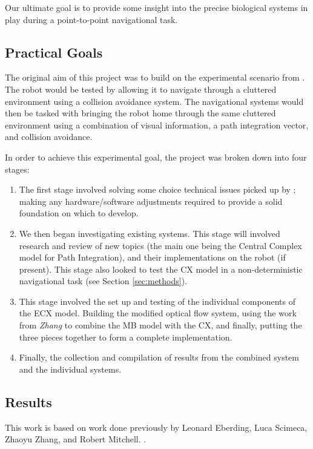 \documentclass[a4paper,11pt,twoside,openright]{article}
\begin{document}
Our ultimate goal is to provide some insight into the precise biological
systems in play during a point-to-point navigational task.

\subsection { Practical Goals }
The original aim of this project was to build on the experimental
scenario from \cite{Mitchell2018}. The robot would be tested by
allowing it to navigate through a cluttered environment using a
collision avoidance system. The navigational systems would then be
tasked with bringing the robot home through the same cluttered
environment using a combination of visual information, a path
integration vector, and collision avoidance.
\newline
\par

In order to achieve this experimental goal, the project was broken down
into four stages:

\begin{enumerate}
\item{The first stage involved solving some choice technical issues
  picked up by \cite{Mitchell2018}; making any hardware/software adjustments
  required to provide a solid foundation on which to develop.}

\item{We then began investigating existing systems. This stage will
  involved research and review of new topics (the main one being the
  Central Complex model for Path Integration), and their
  implementations on the robot (if present). This stage also looked to
  test the CX model in a non-deterministic navigational task (see
  Section \ref{sec:methods}).}

\item{This stage  involved the set up and testing of the individual components
  of the ECX model. Building the modified optical flow system, using the work
  from \textit{Zhang} to combine the MB model with the CX, and finally, putting
  the three pieces together to form a complete implementation.}

\item{Finally, the collection and compilation of results from the combined system
and the individual systems.}
\end{enumerate}

\subsection { Results }
This work is based on work done previously by Leonard Eberding, Luca Scimeca,
Zhaoyu Zhang, and Robert Mitchell.
\cite{Eberding2016, Scimeca2017, Zhang2017, Mitchell2018}.
\newline
\end{document}
